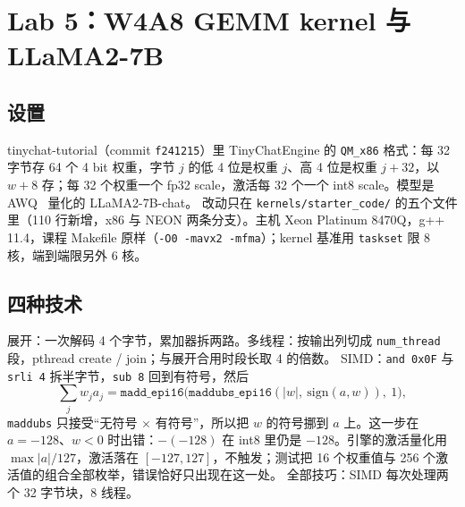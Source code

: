 \documentclass[11pt,a4paper]{ctexart}
\begin{document}
\section{Lab 5：W4A8 GEMM kernel 与 LLaMA2-7B}\label{sec:lab5}

\subsection{设置}
tinychat-tutorial（commit \texttt{f241215}）里 TinyChatEngine 的 \texttt{QM\_x86} 格式：每 32 字节存 64 个 4 bit 权重，字节 $j$ 的低 4 位是权重 $j$、高 4 位是权重 $j+32$，以 $w+8$ 存；每 32 个权重一个 fp32 scale，激活每 32 个一个 int8 scale。模型是 AWQ~\cite{awq} 量化的 LLaMA2-7B-chat。
改动只在 \texttt{kernels/starter\_code/} 的五个文件里（110 行新增，x86 与 NEON 两条分支）。主机 Xeon Platinum 8470Q，g++ 11.4，课程 Makefile 原样（\texttt{-O0 -mavx2 -mfma}）；kernel 基准用 \texttt{taskset} 限 8 核，端到端限另外 6 核。

\subsection{四种技术}
展开：一次解码 4 个字节，累加器拆两路。多线程：按输出列切成 \texttt{num\_thread} 段，pthread create / join；与展开合用时段长取 4 的倍数。
SIMD：\texttt{and 0x0F} 与 \texttt{srli 4} 拆半字节，\texttt{sub 8} 回到有符号，然后
\begin{equation}
\textstyle\sum_j w_j a_j = \texttt{madd\_epi16}\bigl(\texttt{maddubs\_epi16}(|w|,\ \mathrm{sign}(a, w)),\ 1\bigr),
\end{equation}
\texttt{maddubs} 只接受“无符号 $\times$ 有符号”，所以把 $w$ 的符号挪到 $a$ 上。这一步在 $a=-128$、$w<0$ 时出错：$-(-128)$ 在 int8 里仍是 $-128$。引擎的激活量化用 $\max|a|/127$，激活落在 $[-127,127]$，不触发；测试把 16 个权重值与 256 个激活值的组合全部枚举，错误恰好只出现在这一处。
全部技巧：SIMD 每次处理两个 32 字节块，8 线程。
\end{document}
